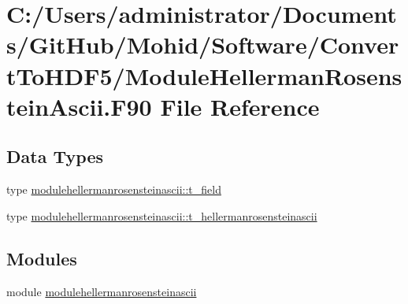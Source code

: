 \hypertarget{_module_hellerman_rosenstein_ascii_8_f90}{}\section{C\+:/\+Users/administrator/\+Documents/\+Git\+Hub/\+Mohid/\+Software/\+Convert\+To\+H\+D\+F5/\+Module\+Hellerman\+Rosenstein\+Ascii.F90 File Reference}
\label{_module_hellerman_rosenstein_ascii_8_f90}
\subsection*{Data Types}
\begin{DoxyCompactItemize}
\item 
type \mbox{\hyperlink{structmodulehellermanrosensteinascii_1_1t__field}{modulehellermanrosensteinascii\+::t\+\_\+field}}
\item 
type \mbox{\hyperlink{structmodulehellermanrosensteinascii_1_1t__hellermanrosensteinascii}{modulehellermanrosensteinascii\+::t\+\_\+hellermanrosensteinascii}}
\end{DoxyCompactItemize}
\subsection*{Modules}
\begin{DoxyCompactItemize}
\item 
module \mbox{\hyperlink{namespacemodulehellermanrosensteinascii}{modulehellermanrosensteinascii}}
\end{DoxyCompactItemize}
